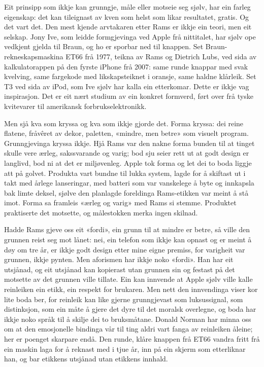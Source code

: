 Eit prinsipp som ikkje kan grunngje, måle eller motseie seg sjølv, har ein farleg eigenskap: det kan tileignast av kven som helst som likar resultatet, gratis. Og det vart det. Den mest kjende arvtakaren etter Rams er ikkje ein teori, men eit selskap. Jony Ive, som leidde formgjevinga ved Apple frå nittitalet, har sjølv ope vedkjent gjelda til Braun, og ho er sporbar ned til knappen. Set Braun-rekneskapsmaskina ET66 frå 1977, teikna av Rams og Dietrich Lubs, ved sida av kalkulatorappen på den fyrste iPhone frå 2007: same runde knappar med svak kvelving, same fargekode med likskapsteiknet i oransje, same haldne klårleik. Set T3 ved sida av iPod, som Ive sjølv har kalla ein etterkomar. Dette er ikkje vag inspirasjon. Det er eit nært studium av ein konkret formverd, ført over frå tyske kvitevarer til amerikansk forbrukselektronikk.

Men sjå kva som kryssa og kva som ikkje gjorde det. Forma kryssa: dei reine flatene, fråvêret av dekor, paletten, «mindre, men betre» som visuelt program. Grunngjevinga kryssa ikkje. Hjå Rams var den nakne forma bunden til at tinget skulle vere ærleg, sakssvarande og varig; bod sju seier rett ut at godt design er langlivd, bod ni at det er miljøvenleg. Apple tok forma og let dei to boda liggje att på golvet. Produkta vart bundne til lukka system, lagde for å skiftast ut i takt med årlege lanseringar, med batteri som var vanskelege å byte og innkapsla bak limte deksel, sjølve den planlagde foreldinga Rams-etikken var meint å stå imot. Forma sa framleis «ærleg og varig» med Rams si stemme. Produktet praktiserte det motsette, og målestokken merka ingen skilnad.

Hadde Rams gjeve oss eit «fordi», ein grunn til at mindre er betre, så ville den grunnen reist seg mot lånet: nei, ein telefon som ikkje kan opnast og er meint å døy om tre år, er ikkje godt design etter mine eigne premiss, for varigheit var grunnen, ikkje pynten. Men aforismen har ikkje noko «fordi». Han har eit utsjånad, og eit utsjånad kan kopierast utan grunnen sin og festast på det motsette av det grunnen ville tillate. Ein kan innvende at Apple sjølv ville kalle reinleiken ein etikk, ein respekt for brukaren. Men nett den innvendinga viser kor lite boda ber, for reinleik kan like gjerne grunngjevast som luksussignal, som distinksjon, som ein måte å gjere det dyre til det moralsk overlegne, og boda har ikkje noko språk til å skilje dei to bruksmåtane. Donald Norman har minna oss om at den emosjonelle bindinga vår til ting aldri vart fanga av reinleiken åleine\autocite{norman2004emotional}; her er poenget skarpare endå. Den runde, klåre knappen frå ET66 vandra fritt frå ein maskin laga for å reknast med i tjue år, inn på ein skjerm som etterliknar han, og bar etikkens utsjånad utan etikkens innhald.

